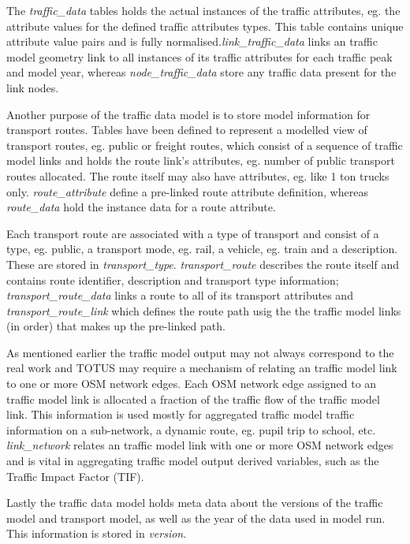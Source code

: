 The \textit{traffic\_data} tables holds the actual instances
of the traffic attributes, eg. the attribute values for the defined
traffic attributes types. This table contains unique attribute value
pairs and is fully normalised.\textit{link\_traffic\_data}
links an traffic model geometry link to all instances of its traffic
attributes for each traffic peak and model year, whereas
\textit{node\_traffic\_data} store any traffic data present
for the link nodes.

Another purpose of the traffic data model is to store model information
for transport routes. Tables have been defined to represent a modelled
view of transport routes, eg. public or freight routes, which consist
of a sequence of traffic model links and holds the route
link's attributes, eg. number of public transport
routes allocated. The route itself may also have attributes, eg. like 1
ton trucks only. \textit{route\_attribute} define a
pre-linked route attribute definition, whereas
\textit{route\_data} hold the instance data for a route
attribute.

Each transport route are associated with a type of transport and consist
of a type, eg. public, a transport mode, eg. rail, a vehicle, eg. train
and a description. These are stored in
\textit{transport\_type}.
\textit{transport\_route} describes the route itself and
contains route identifier, description and transport type information;
\textit{transport\_route\_data} links a route to all of its
transport attributes and \textit{transport\_route\_link}
which defines the route path usig the the traffic model links (in
order) that makes up the pre-linked path.

As mentioned earlier the traffic model output may not always correspond
to the real work and TOTUS may require a mechanism of relating an
traffic model link to one or more OSM network edges. Each OSM network
edge assigned to an traffic model link is allocated a fraction of the
traffic flow of the traffic model link. This information is used mostly
for aggregated traffic model traffic information on a sub-network, a
dynamic route, eg. pupil trip to school, etc.
\textit{link\_network} relates an traffic model link with
one or more OSM network edges and is vital in aggregating traffic model
output derived variables, such as the Traffic Impact Factor (TIF).

Lastly the traffic data model holds meta data about the versions of the
traffic model and transport model, as well as the year of the data used
in model run. This information is stored in
\textit{version}.

